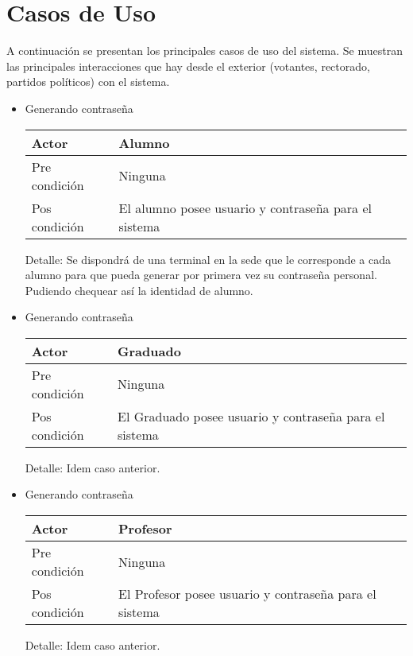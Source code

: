\section{Casos de Uso}

A continuaci\'on se presentan los principales casos de uso del sistema.
Se muestran las principales interacciones que hay desde el exterior (votantes, rectorado, partidos pol\'iticos) con el sistema.


\begin{itemize}
\bigskip
\item Generando contraseña
\bigskip
\begin{center}
\begin{tabular}{ll}
Actor & Alumno \\
\hline
Pre condición & Ninguna \\
\hline
Pos condición & El alumno posee usuario y contraseña para el sistema\\
\hline
\end{tabular}
\medskip
Detalle: Se dispondrá de una terminal en la sede que le corresponde a cada alumno para que pueda generar por primera vez su contraseña personal. Pudiendo chequear así la identidad de alumno.
\end{center}

\bigskip
\item Generando contraseña
\bigskip
\begin{center}
\begin{tabular}{ll}
Actor & Graduado \\
\hline
Pre condición & Ninguna \\
\hline
Pos condición & El Graduado posee usuario y contraseña para el sistema\\
\hline
\end{tabular}
\medskip
Detalle: Idem caso anterior.
\end{center}

\bigskip
\item Generando contraseña
\bigskip
\begin{center}
\begin{tabular}{ll}
Actor & Profesor \\
\hline
Pre condición & Ninguna \\
\hline
Pos condición & El Profesor posee usuario y contraseña para el sistema\\
\hline
\end{tabular}
\medskip
Detalle: Idem caso anterior.
\end{center}


\end{itemize}
